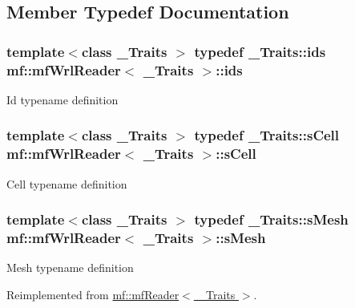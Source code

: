\subsection{Member Typedef Documentation}
\hypertarget{classmf_1_1mfWrlReader_a218ccc566be4401a60f0b321effaae8c}{
\subsubsection[{ids}]{\setlength{\rightskip}{0pt plus 5cm}template$<$class \_\-Traits $>$ typedef \_\-Traits::ids {\bf mf::mfWrlReader}$<$ \_\-Traits $>$::{\bf ids}}}
\label{classmf_1_1mfWrlReader_a218ccc566be4401a60f0b321effaae8c}
Id typename definition \hypertarget{classmf_1_1mfWrlReader_a166fbf92ac3c8aad7eb1d8acf7f7541c}{
\subsubsection[{sCell}]{\setlength{\rightskip}{0pt plus 5cm}template$<$class \_\-Traits $>$ typedef \_\-Traits::sCell {\bf mf::mfWrlReader}$<$ \_\-Traits $>$::{\bf sCell}}}
\label{classmf_1_1mfWrlReader_a166fbf92ac3c8aad7eb1d8acf7f7541c}
Cell typename definition \hypertarget{classmf_1_1mfWrlReader_a00a23984c72a850fbc105870596d6d78}{
\subsubsection[{sMesh}]{\setlength{\rightskip}{0pt plus 5cm}template$<$class \_\-Traits $>$ typedef \_\-Traits::sMesh {\bf mf::mfWrlReader}$<$ \_\-Traits $>$::{\bf sMesh}}}
\label{classmf_1_1mfWrlReader_a00a23984c72a850fbc105870596d6d78}
Mesh typename definition 

Reimplemented from \hyperlink{classmf_1_1mfReader}{mf::mfReader$<$ \_\-Traits $>$}.

